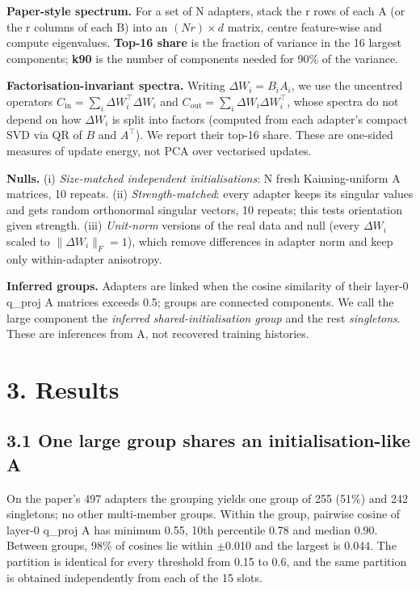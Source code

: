\documentclass[
  11pt,
]{article}
\begin{document}
\textbf{Paper-style spectrum.} For a set of N adapters, stack the r rows
of each A (or the r columns of each B) into an \((N r) \times d\)
matrix, centre feature-wise and compute eigenvalues. \textbf{Top-16
share} is the fraction of variance in the 16 largest components;
\textbf{k90} is the number of components needed for 90\% of the
variance.

\textbf{Factorisation-invariant spectra.} Writing
\(\Delta W_i = B_i A_i\), we use the uncentred operators
\(C_{\text{in}} = \sum_i \Delta W_i^\top \Delta W_i\) and
\(C_{\text{out}} = \sum_i \Delta W_i \Delta W_i^\top\), whose spectra do
not depend on how \(\Delta W_i\) is split into factors (computed from
each adapter's compact SVD via QR of \(B\) and \(A^\top\)). We report
their top-16 share. These are one-sided measures of update energy, not
PCA over vectorised updates.

\textbf{Nulls.} (i) \emph{Size-matched independent initialisations}: N
fresh Kaiming-uniform A matrices, 10 repeats. (ii)
\emph{Strength-matched}: every adapter keeps its singular values and
gets random orthonormal singular vectors, 10 repeats; this tests
orientation given strength. (iii) \emph{Unit-norm} versions of the real
data and null (every \(\Delta W_i\) scaled to \(\|\Delta W_i\|_F = 1\)),
which remove differences in adapter norm and keep only within-adapter
anisotropy.

\textbf{Inferred groups.} Adapters are linked when the cosine similarity
of their layer-0 q\_proj A matrices exceeds 0.5; groups are connected
components. We call the large component the \emph{inferred
shared-initialisation group} and the rest \emph{singletons}. These are
inferences from A, not recovered training histories.

\section{3. Results}\label{results}

\subsection{3.1 One large group shares an initialisation-like
A}\label{one-large-group-shares-an-initialisation-like-a}

On the paper's 497 adapters the grouping yields one group of 255 (51\%)
and 242 singletons; no other multi-member groups. Within the group,
pairwise cosine of layer-0 q\_proj A has minimum 0.55, 10th percentile
0.78 and median 0.90. Between groups, 98\% of cosines lie within \ensuremath{\pm}0.010
and the largest is 0.044. The partition is identical for every threshold
from 0.15 to 0.6, and the same partition is obtained independently from
each of the 15 slots.
\end{document}
